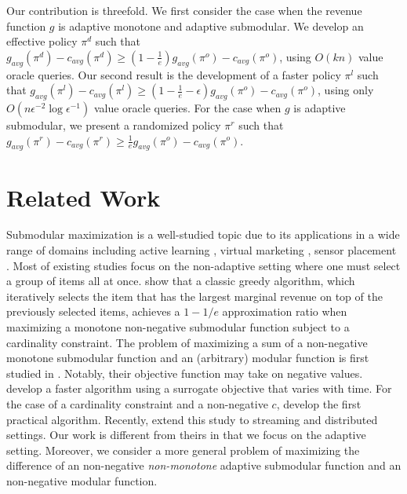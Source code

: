 \documentclass[twoside,leqno,twocolumn]{article}
\begin{document}
Our contribution is threefold. We first consider the case when the revenue function   $g$ is  adaptive monotone and adaptive submodular. We develop an effective policy $\pi^d$ such that $g_{avg}(\pi^d) - c_{avg}(\pi^d) \geq (1-\frac{1}{e})g_{avg}(\pi^o) - c_{avg}(\pi^o)$,  using $O(kn)$ value oracle queries. Our second result is the development of a faster policy $\pi^l$ such that $g_{avg}(\pi^l) - c_{avg}(\pi^l) \geq (1-\frac{1}{e}-\epsilon)g_{avg}(\pi^o) - c_{avg}(\pi^o)$,  using only $O(n\epsilon^{-2}\log \epsilon^{-1})$ value oracle queries. For the case when $g$ is adaptive submodular, we present a randomized policy $\pi^r$ such that  $g_{avg}(\pi^r) - c_{avg}(\pi^r) \geq \frac{1}{e}g_{avg}(\pi^o) - c_{avg}(\pi^o)$.

\section{Related Work}
Submodular maximization is a well-studied topic due to its applications in a wide range of domains including active learning \cite{golovin2011adaptive}, virtual marketing \cite{tang2020influence,yuan2017no}, sensor placement \cite{krause2007near}. Most of existing studies focus on the non-adaptive setting where one must select a group of items all at once. \cite{nemhauser1978analysis} show that a classic greedy algorithm, which iteratively selects the item that has the largest marginal revenue  on top of the previously selected items, achieves a $1-1/e$ approximation ratio when maximizing a monotone non-negative submodular function subject to a cardinality constraint. The problem of maximizing a sum of a non-negative monotone submodular function and  an (arbitrary) modular function is first studied in \cite{sviridenko2017optimal}. Notably, their objective function  may take on negative values. \cite{feldman2020guess} develop a faster algorithm using a surrogate objective that varies with time. For the case of a cardinality constraint and a non-negative $c$, \cite{harshaw2019submodular} develop the first practical algorithm. Recently, \cite{kazemi2020regularized} extend this study to streaming and distributed settings. Our work is different from theirs in that we focus on  the adaptive setting. Moreover, we consider a more general problem of maximizing the difference of an non-negative \emph{non-monotone} adaptive submodular function and  an non-negative modular function.
\end{document}

